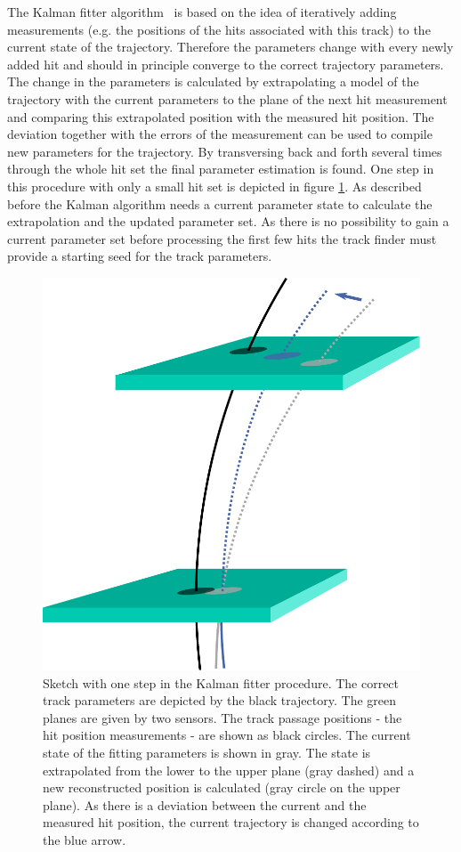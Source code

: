 The Kalman fitter algorithm~\cite{kalman} is based on the idea of iteratively adding measurements (e.g. the positions of the hits associated with this track) to the current state of the trajectory. Therefore the parameters change with every newly added hit and should in principle converge to the correct trajectory parameters. The change in the parameters is calculated by extrapolating a model of the trajectory with the current parameters to the plane of the next hit measurement and comparing this extrapolated position with the measured hit position. The deviation together with the errors of the measurement can be used to compile new parameters for the trajectory. By transversing back and forth several times through the whole hit set the final parameter estimation is found. One step in this procedure with only a small hit set is depicted in figure \ref{fig-kalman}. As described before the Kalman algorithm needs a current parameter state to calculate the extrapolation and the updated parameter set. As there is no possibility to gain a current parameter set before processing the first few hits the track finder must provide a starting seed for the track parameters.

\begin{figure}
 \centering
 \includegraphics[width=0.6\linewidth]{figures/theory/kalman.pdf}
 \caption[One step of the Kalman fitter procedure.]{Sketch with one step in the Kalman fitter procedure. The correct track parameters are depicted by the black trajectory. The green planes are given by two sensors. The track passage positions - the hit position measurements - are shown as black circles. The current state of the fitting parameters is shown in gray. The state is extrapolated from the lower to the upper plane (gray dashed) and a new reconstructed position is calculated (gray circle on the upper plane). As there is a deviation between the current and the measured hit position, the current trajectory is changed according to the blue arrow.}
 \label{fig-kalman}
\end{figure}

